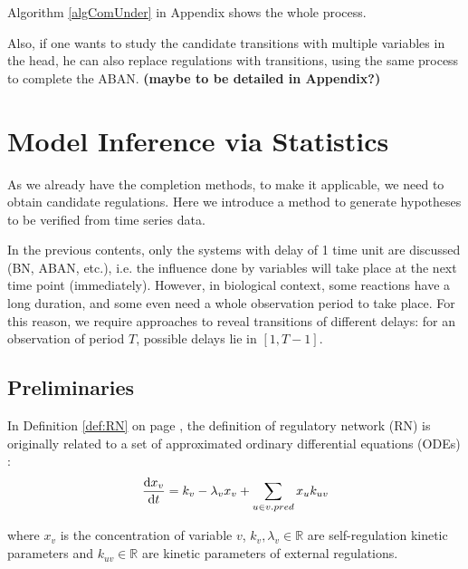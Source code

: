 Algorithm \ref{algComUnder} in Appendix shows the whole process.

Also, if one wants to study the candidate transitions with multiple variables in the head, he can also replace regulations with transitions, using the same process to complete the ABAN. \textbf{(maybe to be detailed in Appendix?)} 

\section{Model Inference via Statistics}
As we already have the completion methods, to make it applicable, we need to obtain candidate regulations.
Here we introduce a method to generate hypotheses to be verified from time series data.

In the previous contents, only the systems with delay of 1 time unit are discussed (BN, ABAN, etc.), i.e. the influence done by variables will take place at the next time point (immediately).
However, in biological context, some reactions have a long duration, and some even need a whole observation period to take place.
For this reason, we require approaches to reveal transitions of different delays: for an observation of period $T$, possible delays lie in $[1,T-1]$.

\subsection{Preliminaries}
In Definition \ref{def:RN} on page \pageref{def:RN}, the definition of regulatory network (RN) is originally related to a set of approximated ordinary differential equations (ODEs) \cite{khalis2009smbionet}:
$$\dfrac{{\rm d}x_v}{{\rm d}t}=k_v-\lambda_v x_v +\sum_{u\in v.pred}{x_uk_{uv}}$$

where $x_v$ is the concentration of variable $v$, $k_v, \lambda_v\in \mathbb{R}$ are self-regulation kinetic parameters and $k_{uv}\in \mathbb{R}$ are kinetic parameters of external regulations.


